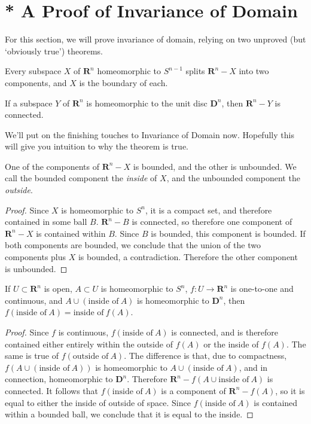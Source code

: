 \section{* A Proof of Invariance of Domain}

For this section, we will prove invariance of domain, relying on two unproved (but `obviously true') theorems.

\begin{theorem}
    Every subspace $X$ of $\mathbf{R}^n$ homeomorphic to $S^{n-1}$ splits $\mathbf{R}^n - X$ into two components, and $X$ is the boundary of each.
\end{theorem}

\begin{theorem}
    If a subspace $Y$ of $\mathbf{R}^n$ is homeomorphic to the unit disc $\mathbf{D}^n$, then $\mathbf{R}^n - Y$ is connected.
\end{theorem}

We'll put on the finishing touches to Invariance of Domain now. Hopefully this will give you intuition to why the theorem is true.

\begin{lemma}
    One of the components of $\mathbf{R}^n - X$ is bounded, and the other is unbounded. We call the bounded component the \emph{inside} of $X$, and the unbounded component the \emph{outside}.
\end{lemma}
\begin{proof}
    Since $X$ is homeomorphic to $S^n$, it is a compact set, and therefore contained in some ball $B$. $\mathbf{R}^n - B$ is connected, so therefore one component of $\mathbf{R}^n - X$ is contained within $B$. Since $B$ is bounded, this component is bounded. If both components are bounded, we conclude that the union of the two components plus $X$ is bounded, a contradiction. Therefore the other component is unbounded.
\end{proof}

\begin{lemma}
    If $U \subset \mathbf{R}^n$ is open, $A \subset U$ is homeomorphic to $S^n$, $f:U \to \mathbf{R}^n$ is one-to-one and continuous, and $A \cup (\text{inside of}\ A)$ is homeomorphic to $\mathbf{D}^n$, then $f(\text{inside of}\ A) = \text{inside of}\ f(A)$.
\end{lemma}
\begin{proof}
    Since $f$ is continuous, $f(\text{inside of}\ A)$ is connected, and is therefore contained either entirely within the outside of $f(A)$ or the inside of $f(A)$. The same is true of $f(\text{outside of}\ A)$. The difference is that, due to compactness, $f(A \cup (\text{inside of}\ A))$ is homeomorphic to $A \cup (\text{inside of}\ A)$, and in connection, homeomorphic to $\mathbf{D}^n$. Therefore $\mathbf{R}^n - f(A \cup \text{inside of}\ A)$ is connected. It follows that $f(\text{inside of}\ A)$ is a component of $\mathbf{R}^n - f(A)$, so it is equal to either the inside of outside of space. Since $f(\text{inside of}\ A)$ is contained within a bounded ball, we conclude that it is equal to the inside.
\end{proof}

